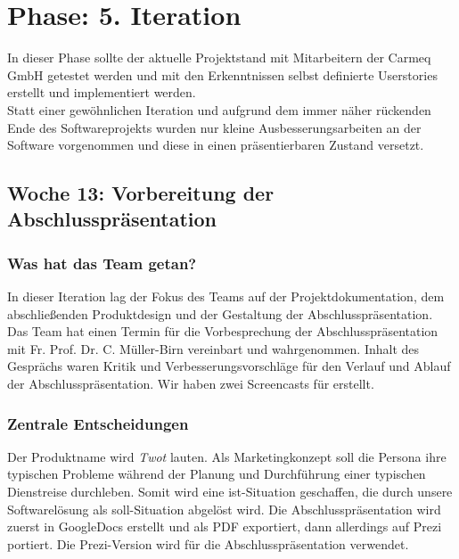 \documentclass{article}
\begin{document}


\section{Phase: 5. Iteration}

In dieser Phase sollte der aktuelle Projektstand mit Mitarbeitern der Carmeq GmbH getestet werden und mit den Erkenntnissen selbst definierte Userstories erstellt und implementiert werden.\\
Statt einer gew\"ohnlichen Iteration und aufgrund dem immer n\"aher r\"uckenden Ende des Softwareprojekts wurden nur kleine Ausbesserungsarbeiten an der Software vorgenommen und diese in einen pr\"asentierbaren Zustand versetzt.

\subsection{Woche 13: Vorbereitung der Abschlusspr\"asentation}

\subsubsection{Was hat das Team getan?}

In dieser Iteration lag der Fokus des Teams auf der Projektdokumentation, dem abschlie\ss enden Produktdesign und der Gestaltung der Abschlusspr\"asentation.\\
Das Team hat einen Termin f\"ur die Vorbesprechung der Abschlusspr\"asentation mit Fr. Prof. Dr. C. M\"uller-Birn vereinbart und wahrgenommen. Inhalt des Gespr\"achs waren Kritik und Verbesserungsvorschl\"age für den Verlauf und Ablauf der Abschlusspr\"asentation. Wir haben zwei Screencasts f\"ur erstellt.

\subsubsection{Zentrale Entscheidungen}

Der Produktname wird \textit{Twot} lauten. Als Marketingkonzept soll die Persona ihre typischen Probleme w\"ahrend der Planung und Durchf\"uhrung einer typischen Dienstreise durchleben. Somit wird eine ist-Situation geschaffen, die durch unsere Softwarel\"osung als soll-Situation abgel\"ost wird. Die Abschlusspr\"asentation wird zuerst in GoogleDocs erstellt und als PDF exportiert, dann allerdings auf Prezi portiert. Die Prezi-Version wird f\"ur die Abschlusspr\"asentation verwendet. 
\end{document}
